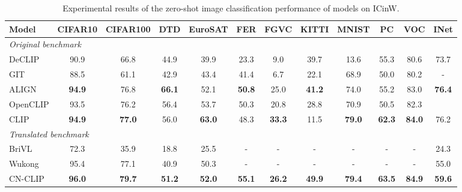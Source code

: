 \begin{table}[t]
\center
\small
\vskip 0.15in
\begin{adjustbox}{max width=1.\textwidth}
\begin{tabular}{@{\extracolsep{\fill}}lccccccccccc}
\toprule
    Model & CIFAR10 & CIFAR100 & DTD & EuroSAT & FER & FGVC & KITTI & MNIST & PC & VOC & INet\\
\midrule
    \multicolumn{8}{l}{\textit{Original benchmark}} \\
    DeCLIP  & 90.9 & 66.8 & 44.9 & 39.9 & 23.3 & 9.0 & 39.7 & 13.6 & 55.3  & 80.6 & 73.7\\
    GIT  & 88.5 & 61.1 & 42.9 & 43.4 & 41.4 & 6.7 & 22.1 & 68.9 & 50.0 & 80.2 & -\\
    ALIGN & \textbf{94.9} & 76.8 & \textbf{66.1} & 52.1 & \textbf{50.8} & 25.0 & \textbf{41.2} & 74.0 & 55.2 & 83.0 & \textbf{76.4}\\
    OpenCLIP  & 93.5 & 76.2 & 56.4 & 53.7 & 50.3 & 20.8 & 28.8 & 70.9 & 50.5 & 82.3 \\
    CLIP  & \textbf{94.9} & \textbf{77.0} & 56.0 & \textbf{63.0} & 48.3 & \textbf{33.3} & 11.5 &\textbf{79.0} & \textbf{62.3} & \textbf{84.0} & 76.2\\
\midrule
    \multicolumn{8}{l}{\textit{Translated benchmark}} \\
    BriVL  & 72.3 & 35.9 & 18.8 & 25.5 & - & - & - & - & -  & - & 24.3\\
    Wukong & 95.4 & 77.1 & 40.9 & 50.3 & - & - & - & - & -  & - & 55.0\\
    CN-CLIP & \textbf{96.0} & \textbf{79.7} & \textbf{51.2} & \textbf{52.0} & \textbf{55.1} & \textbf{26.2} & \textbf{49.9} & \textbf{79.4} & \textbf{63.5} & \textbf{84.9} & \textbf{59.6} \\
\bottomrule
\end{tabular}
\end{adjustbox}
\caption{Experimental results of the zero-shot image classification performance of models on ICinW. }
\label{tb:zs_v2}
\end{table}

